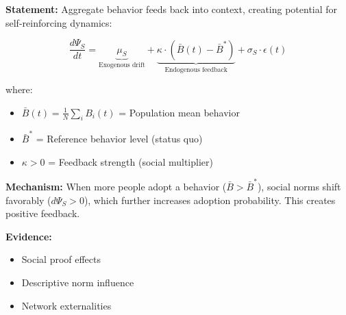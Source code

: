 \documentclass[11pt, a4paper]{article}
\begin{document}
\begin{tcolorbox}[colback=red!5!white, colframe=red!75!black,
    title=\textbf{Axiom NTM-A4: Behavior-Context Feedback Loop}]

\textbf{Statement:} Aggregate behavior feeds back into context, creating potential for self-reinforcing dynamics:

\begin{equation}
\frac{d\Psi_S}{dt} = \underbrace{\mu_S}_{\text{Exogenous drift}} + \underbrace{\kappa \cdot (\bar{B}(t) - \bar{B}^*)}_{\text{Endogenous feedback}} + \sigma_S \cdot \epsilon(t)
\label{eq:feedback-loop}
\end{equation}

where:
\begin{itemize}[nosep]
\item $\bar{B}(t) = \frac{1}{N}\sum_i B_i(t)$ = Population mean behavior
\item $\bar{B}^*$ = Reference behavior level (status quo)
\item $\kappa > 0$ = Feedback strength (social multiplier)
\end{itemize}

\textbf{Mechanism:} When more people adopt a behavior ($\bar{B} > \bar{B}^*$), social norms shift favorably ($d\Psi_S > 0$), which further increases adoption probability. This creates positive feedback.

\textbf{Evidence:}
\begin{itemize}[nosep]
\item Social proof effects \citep{cialdini2004social}
\item Descriptive norm influence \citep{bicchieri2005grammar}
\item Network externalities \citep{rogers2003diffusion}
\end{itemize}

\end{tcolorbox}
\end{document}
